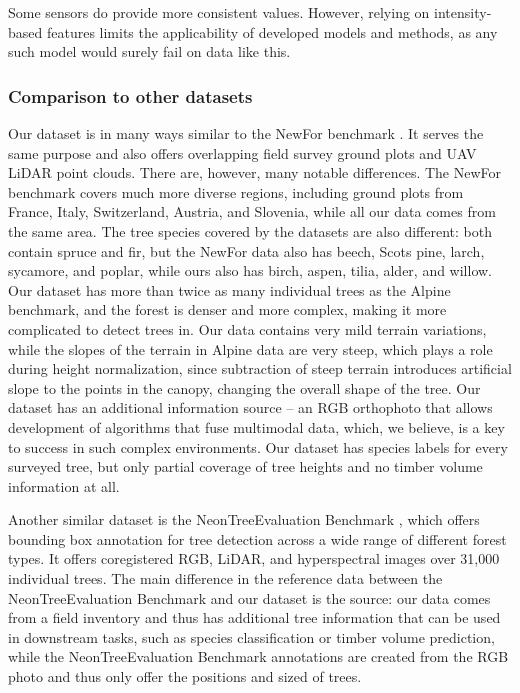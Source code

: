 Some sensors do provide more consistent values.
However, relying on intensity-based features limits the applicability of developed models and methods, as any such model would surely fail on data like this.

\subsubsection{Comparison to other datasets}

Our dataset is in many ways similar to the NewFor benchmark \cite{eysnAlpineITDBenchmark2015}.
It serves the same purpose and also offers overlapping field survey ground plots and UAV LiDAR point clouds.
There are, however, many notable differences.
The NewFor benchmark covers much more diverse regions, including ground plots from France, Italy, Switzerland, Austria, and Slovenia, while all our data comes from the same area.
The tree species covered by the datasets are also different: both contain spruce and fir, but the NewFor data also has beech, Scots pine, larch, sycamore, and poplar, while ours also has birch, aspen, tilia, alder, and willow.
Our dataset has more than twice as many individual trees as the Alpine benchmark, and the forest is denser and more complex, making it more complicated to detect trees in.
Our data contains very mild terrain variations, while the slopes of the terrain in Alpine data are very steep, which plays a role during height normalization, since subtraction of steep terrain introduces artificial slope to the points in the canopy, changing the overall shape of the tree.
Our dataset has an additional information source – an RGB orthophoto that allows development of algorithms that fuse multimodal data, which, we believe, is a key to success in such complex environments.
Our dataset has species labels for every surveyed tree, but only partial coverage of tree heights and no timber volume information at all.

Another similar dataset is the NeonTreeEvaluation Benchmark \cite{weinsteinDataNeonTreeEvaluationBenchmark2022}, which offers bounding box annotation for tree detection across a wide range of different forest types.
It offers coregistered RGB, LiDAR, and hyperspectral images over 31,000 individual trees.
The main difference in the reference data between the NeonTreeEvaluation Benchmark and our dataset is the source: our data comes from a field inventory and thus has additional tree information that can be used in downstream tasks, such as species classification or timber volume prediction, while the NeonTreeEvaluation Benchmark annotations are created from the RGB photo and thus only offer the positions and sized of trees.

